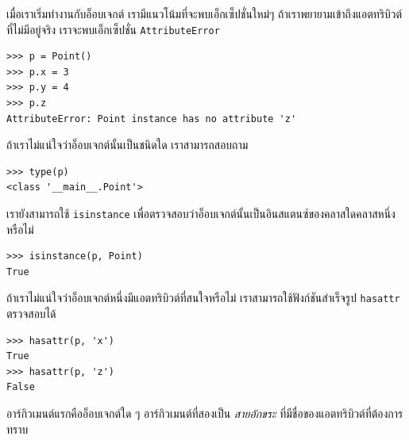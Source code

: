 เมื่อเราเริ่มทำงานกับอ็อบเจกต์ เรามีแนวโน้มที่จะพบเอ็กเซ็ปชั่นใหม่ๆ ถ้าเราพยายามเข้าถึงแอตทริบิวต์ที่ไม่มีอยู่จริง เราจะพบเอ็กเซ็ปชั่น {\tt AttributeError}



\begin{verbatim}
>>> p = Point()
>>> p.x = 3
>>> p.y = 4
>>> p.z
AttributeError: Point instance has no attribute 'z'
\end{verbatim}
%

ถ้าเราไม่แน่ใจว่าอ็อบเจกต์นั้นเป็นชนิดใด เราสามารถสอบถาม

\begin{verbatim}
>>> type(p)
<class '__main__.Point'>
\end{verbatim}
%
เรายังสามารถใช้ {\tt isinstance} เพื่อตรวจสอบว่าอ็อบเจกต์นั้นเป็นอินสแตนซ์ของคลาสใดคลาสหนึ่งหรือไม่

\begin{verbatim}
>>> isinstance(p, Point)
True
\end{verbatim}
%

ถ้าเราไม่แน่ใจว่าอ็อบเจกต์หนึ่งมีแอตทริบิวต์ที่สนใจหรือไม่ เราสามารถใช้ฟังก์ชันสำเร็จรูป {\tt hasattr} ตรวจสอบได้


\begin{verbatim}
>>> hasattr(p, 'x')
True
>>> hasattr(p, 'z')
False
\end{verbatim}
%

อาร์กิวเมนต์แรกคืออ็อบเจกต์ใด ๆ อาร์กิวเมนต์ที่สองเป็น {\em สายอักขระ} ที่มีชื่อของแอตทริบิวต์ที่ต้องการทราบ



